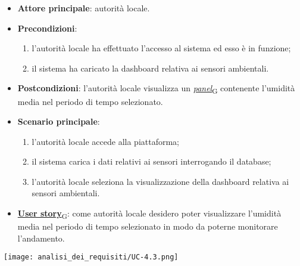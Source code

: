 \begin{itemize}
	\item \textbf{Attore principale}: autorità locale.
	\item \textbf{Precondizioni}:
	      \begin{enumerate}
		      \item l'autorità locale ha effettuato l'accesso al sistema ed esso è in funzione;
		      \item il sistema ha caricato la dashboard relativa ai sensori ambientali.
	      \end{enumerate}
	\item \textbf{Postcondizioni}: l'autorità locale visualizza un \href{https://7last.github.io/docs/rtb/documentazione-interna/glossario\#panel}{\textit{panel}\textsubscript{G}} contenente l'umidità media nel periodo di tempo selezionato.
	\item \textbf{Scenario principale}:
	      \begin{enumerate}
		      \item l'autorità locale accede alla piattaforma;
		      \item il sistema carica i dati relativi ai sensori interrogando il database;
		      \item l'autorità locale seleziona la visualizzazione della dashboard relativa ai sensori ambientali.
	      \end{enumerate}
	\item \href{https://7last.github.io/docs/rtb/documentazione-interna/glossario\#user-story}{\textbf{User story}\textsubscript{G}}: come autorità locale desidero poter visualizzare l'umidità media nel periodo di tempo selezionato
	      in modo da poterne monitorare l'andamento.
\end{itemize}
\begin{center}
	\texttt{[image: analisi\_dei\_requisiti/UC-4.3.png]}
\end{center}


